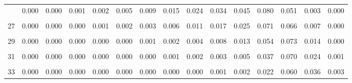 \documentclass[
]{article}
\begin{document}
\begin{table}[!h]
{\begin{tabular}[t]{ccccccccccccccc}
\addlinespace
25 & 0.000 & 0.000 & 0.001 & 0.002 & 0.005 & 0.009 & 0.015 & 0.024 & 0.034 & 0.045 & 0.080 & 0.051 & 0.003 & 0.000\\
\cellcolor{gray!10}{26} & \cellcolor{gray!10}{0.000} & \cellcolor{gray!10}{0.000} & \cellcolor{gray!10}{0.001} & \cellcolor{gray!10}{0.001} & \cellcolor{gray!10}{0.003} & \cellcolor{gray!10}{0.006} & \cellcolor{gray!10}{0.010} & \cellcolor{gray!10}{0.016} & \cellcolor{gray!10}{0.025} & \cellcolor{gray!10}{0.034} & \cellcolor{gray!10}{0.076} & \cellcolor{gray!10}{0.059} & \cellcolor{gray!10}{0.005} & \cellcolor{gray!10}{0.000}\\
27 & 0.000 & 0.000 & 0.000 & 0.001 & 0.002 & 0.003 & 0.006 & 0.011 & 0.017 & 0.025 & 0.071 & 0.066 & 0.007 & 0.000\\
\cellcolor{gray!10}{28} & \cellcolor{gray!10}{0.000} & \cellcolor{gray!10}{0.000} & \cellcolor{gray!10}{0.000} & \cellcolor{gray!10}{0.000} & \cellcolor{gray!10}{0.001} & \cellcolor{gray!10}{0.002} & \cellcolor{gray!10}{0.004} & \cellcolor{gray!10}{0.007} & \cellcolor{gray!10}{0.012} & \cellcolor{gray!10}{0.018} & \cellcolor{gray!10}{0.063} & \cellcolor{gray!10}{0.070} & \cellcolor{gray!10}{0.010} & \cellcolor{gray!10}{0.000}\\
29 & 0.000 & 0.000 & 0.000 & 0.000 & 0.000 & 0.001 & 0.002 & 0.004 & 0.008 & 0.013 & 0.054 & 0.073 & 0.014 & 0.000\\
\addlinespace
\cellcolor{gray!10}{30} & \cellcolor{gray!10}{0.000} & \cellcolor{gray!10}{0.000} & \cellcolor{gray!10}{0.000} & \cellcolor{gray!10}{0.000} & \cellcolor{gray!10}{0.000} & \cellcolor{gray!10}{0.001} & \cellcolor{gray!10}{0.001} & \cellcolor{gray!10}{0.003} & \cellcolor{gray!10}{0.005} & \cellcolor{gray!10}{0.008} & \cellcolor{gray!10}{0.045} & \cellcolor{gray!10}{0.073} & \cellcolor{gray!10}{0.018} & \cellcolor{gray!10}{0.001}\\
31 & 0.000 & 0.000 & 0.000 & 0.000 & 0.000 & 0.000 & 0.001 & 0.002 & 0.003 & 0.005 & 0.037 & 0.070 & 0.024 & 0.001\\
\cellcolor{gray!10}{32} & \cellcolor{gray!10}{0.000} & \cellcolor{gray!10}{0.000} & \cellcolor{gray!10}{0.000} & \cellcolor{gray!10}{0.000} & \cellcolor{gray!10}{0.000} & \cellcolor{gray!10}{0.000} & \cellcolor{gray!10}{0.000} & \cellcolor{gray!10}{0.001} & \cellcolor{gray!10}{0.002} & \cellcolor{gray!10}{0.003} & \cellcolor{gray!10}{0.029} & \cellcolor{gray!10}{0.066} & \cellcolor{gray!10}{0.030} & \cellcolor{gray!10}{0.002}\\
33 & 0.000 & 0.000 & 0.000 & 0.000 & 0.000 & 0.000 & 0.000 & 0.000 & 0.001 & 0.002 & 0.022 & 0.060 & 0.036 & 0.003\\

\end{tabular}}
\end{table}
\end{document}
